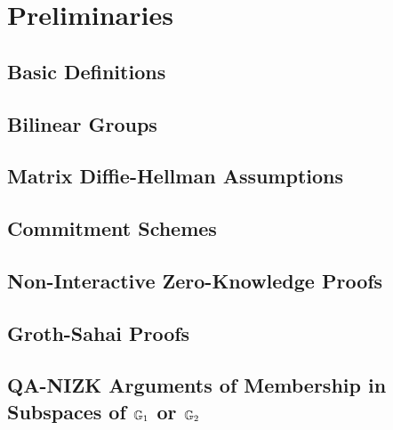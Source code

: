 \chapter{Preliminaries}

    \section{Basic Definitions}

        

    \section{Bilinear Groups}

        

    \section{Matrix Diffie-Hellman  Assumptions} \label{sec:mddh}

        

    \section{Commitment Schemes} \label{sec:commitments}

        

    \section{Non-Interactive Zero-Knowledge Proofs} \label{sec:zk}

        

    \section{Groth-Sahai Proofs}\label{sec:gs-proofs}

        

    \section{QA-NIZK Arguments of Membership in Subspaces of $\mathbb{G}_1$ or $\mathbb{G}_2$} \label{sect:QANIZKlinspace}

        

